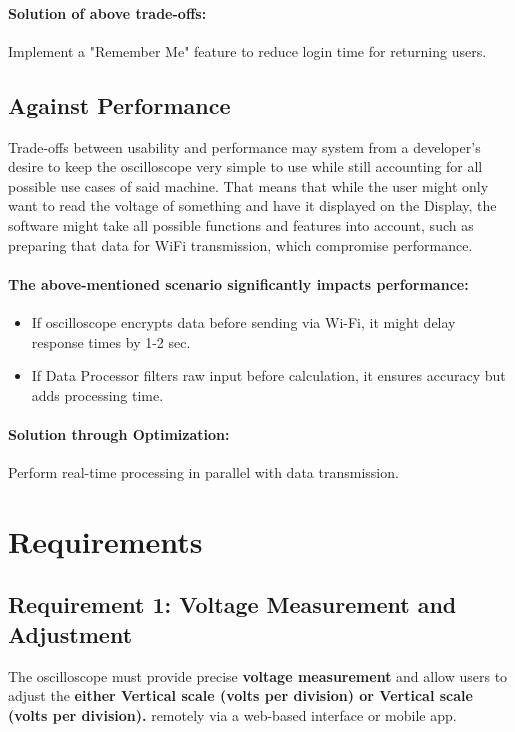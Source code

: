 \paragraph{\textbf{Solution of above trade-offs:}}
 Implement a "Remember Me" feature to reduce login time for returning users.

\subsection{Against Performance}
Trade-offs between usability and performance may system from a developer's desire to keep the oscilloscope very simple to use while still accounting for all possible use cases of said machine. That means that while the user might only want to read the voltage of something and have it displayed on the Display, the software might take all possible functions and features into account, such as preparing that data for WiFi transmission, which compromise performance. 

\paragraph{\textbf{The above-mentioned scenario significantly impacts performance:}}
\begin{itemize}
    \item If oscilloscope encrypts data before sending via Wi-Fi, it might delay response times by 1-2 sec.
    \item If Data Processor filters raw input before calculation, it ensures accuracy but adds processing time.
\end{itemize}
\paragraph{\textbf{Solution through Optimization:}}Perform real-time processing in parallel with data transmission.

\section{Requirements}

\subsection{Requirement 1: Voltage Measurement and Adjustment}
The oscilloscope must provide precise \textbf{voltage measurement} and allow users to adjust the \textbf{either Vertical scale (volts per division) or Vertical scale (volts per division).} remotely via a web-based interface or mobile app.

